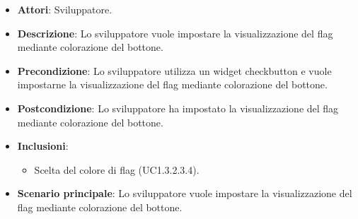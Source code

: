 
\FloatBarrier
\begin{itemize}
\item\textbf{Attori}: Sviluppatore.
\item\textbf{Descrizione}: Lo sviluppatore vuole impostare la visualizzazione del flag mediante colorazione del bottone.
\item\textbf{Precondizione}: Lo sviluppatore utilizza un widget checkbutton e vuole impostarne la visualizzazione del flag mediante colorazione del bottone.
\item\textbf{Postcondizione}: Lo sviluppatore ha impostato la visualizzazione del flag mediante colorazione del bottone.
\item \textbf{Inclusioni}: 
\begin{itemize}
\item Scelta del colore di flag (UC1.3.2.3.4).
\end{itemize}
\item\textbf{Scenario principale}: Lo sviluppatore vuole impostare la visualizzazione del flag mediante colorazione del bottone.
\end{itemize}
